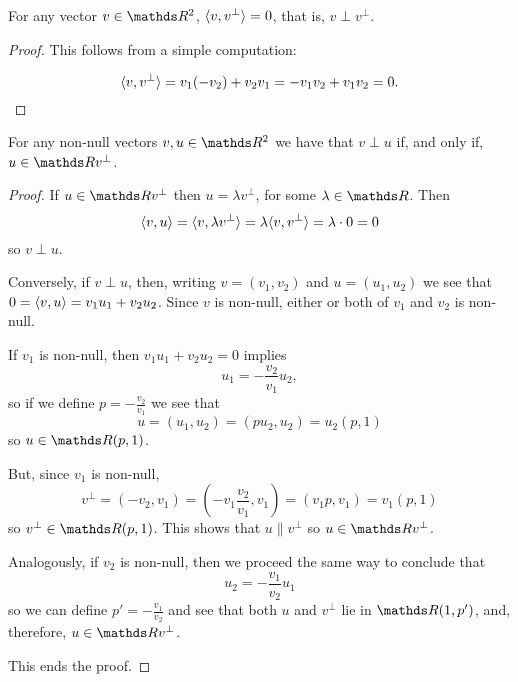 \begin{lemma}
	For any vector $v\in\R^2$, $\langle v,v^\perp\rangle=0$, that is, $v\perp v^\perp$.
\end{lemma}
\begin{proof}
	This follows from a simple computation:
	
	\[\langle v,v^\perp\rangle=v_1(-v_2)+v_2v_1=-v_1v_2+v_1v_2=0.\]
\end{proof}
\begin{cor}
	For any non-null vectors $v,u\in \R^2$ we have that $v\perp u$ if, and only if, $u\in\R v^{\perp}$.
\end{cor}
\begin{proof}
	If $u\in \R v^\perp$ then $u=\lambda v^\perp$, for some $\lambda\in \R$. Then
	\[\langle v,u\rangle=\langle v,\lambda v^\perp\rangle=\lambda \langle v,v^\perp\rangle=\lambda\cdot0=0\]so $v\perp u$.
	
	\bigskip
	Conversely, if $v\perp u$, then, writing $v=(v_1,v_2)$ and $u=(u_1,u_2)$ we see that $0=\langle v,u\rangle=v_1u_1+v_2u_2$. Since $v$ is non-null, either or both of $v_1$ and $v_2$ is non-null.
	
	If $v_1$ is non-null, then $v_1u_1+v_2u_2=0$ implies $$u_1=-\frac{v_2}{v_1}u_2,$$ so if we define $p=-\frac{v_2}{v_1}$ we see that 
	\[u=(u_1,u_2)=(p u_2,u_2)=u_2(p,1)\]so $u\in \R(p,1)$.
	
	But, since $v_1$ is non-null, 
	\[v^{\perp}=(-v_2,v_1)=\left(-v_1\frac{v_2}{v_1},v_1\right)=(v_1p,v_1)=v_1(p,1)\]so $v^\perp\in \R(p,1)$. This shows that $u\parallel v^\perp$ so $u\in \R v^\perp$.
	
	Analogously, if $v_2$ is non-null, then we proceed the same way to conclude that \[u_2=-\frac{v_1}{v_2}u_1\]so we can define $p'=-\frac{v_1}{v_2}$ and see that both $u$ and $v^\perp$ lie in $\R(1,p')$, and, therefore, $u\in\R v^\perp$.
	
	This ends the proof.
\end{proof}

